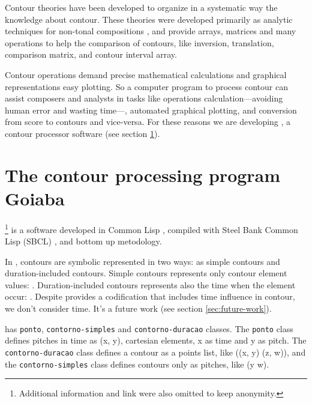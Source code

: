 Contour theories
\cite{friedmann85:methodology,friedmann87:response,morris87:composition,morris93:directions,marvin.ea87:relating,marvin88:generalized,marvin.ea95:generalization,polansky.ea92:possible,quinn97:fuzzy,clifford95:contour,beard03:contour}
have been developed to organize in a systematic way the knowledge
about contour. These theories were developed primarily as analytic
techniques for non-tonal compositions \cite{beard03:contour}, and
provide arrays, matrices and many operations to help the comparison of
contours, like inversion, translation, comparison matrix, and contour
interval array.

Contour operations demand precise mathematical calculations and
graphical representations easy plotting. So a computer program to
process contour can assist composers and analysts in tasks like
operations calculation---avoiding human error and wasting time---,
automated graphical plotting, and conversion from score to contours
and vice-versa. For these reasons we are developing \goiaba{}, a
contour processor software (see section \ref{sec:goiaba}).

\section{The contour processing program Goiaba}
\label{sec:goiaba}

\goiaba{}\footnote{Additional information and link were also omitted
  to keep anonymity.} is a software developed in Common Lisp
\cite{graham94:lisp}, compiled with Steel Bank Common Lisp (SBCL)
\cite{team07:sbcl}, and bottom up metodology.

In \goiaba{}, contours are symbolic represented in two ways: as simple
contours and duration-included contours. Simple contours represents
only contour element values: . Duration-included
contours represents also the time when the element occur: . Despite \goiaba{} provides a codification that
includes time influence in contour, we don't consider time. It's a
future work (see section \ref{sec:future-work}).

\goiaba{} has \texttt{ponto}, \texttt{contorno-simples} and
\texttt{contorno-duracao} classes. The \texttt{ponto} class defines
pitches in time as (x, y), cartesian elements, x as time and y as
pitch. The \texttt{contorno-duracao} class defines a contour as a
points list, like ((x, y) (z, w)), and the \texttt{contorno-simples}
class defines contours only as pitches, like (y w).

